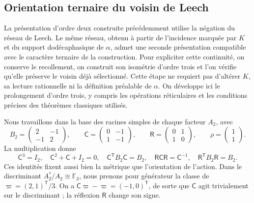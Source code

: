 
\subsection{Orientation ternaire du voisin de Leech}
\label{km:orden-tres-reticular}

La présentation d’ordre deux construite précédemment utilise la négation
du réseau de Leech. Le même réseau, obtenu à partir de l’incidence marquée
par \(K\) et du support dodécaphasique de \(\alpha\), admet une seconde
présentation compatible avec le caractère ternaire de la construction.
Pour expliciter cette continuité, on conserve le recollement, on construit
son isométrie d’ordre trois et l’on vérifie qu’elle préserve le voisin déjà
sélectionné. Cette étape ne requiert pas d’altérer \(K\), sa lecture rationnelle ni
la définition préalable de \(\alpha\). On développe ici le prolongement d’ordre trois, y compris les opérations
réticulaires et les conditions précises des théorèmes classiques utilisés.

Nous travaillons dans la base des racines simples de chaque facteur \(A_2\), avec
\begin{equation}
 B_2=\begin{pmatrix}2&-1\\-1&2\end{pmatrix},\qquad
 \mathsf C=\begin{pmatrix}0&-1\\1&-1\end{pmatrix},\qquad
 \mathsf R=\begin{pmatrix}0&1\\1&0\end{pmatrix},\qquad
 \rho=\begin{pmatrix}1\\1\end{pmatrix}.
 \label{km:coxeter-reflexion}
\end{equation}
La multiplication donne
\[
 \mathsf C^3=I_2,\quad
 \mathsf C^2+\mathsf C+I_2=0,\quad
 \mathsf C^{\mathsf T}B_2\mathsf C=B_2,\quad
 \mathsf R\mathsf C\mathsf R=\mathsf C^{-1},\quad
 \mathsf R^{\mathsf T}B_2\mathsf R=B_2.
\]
Ces identités fixent aussi bien la métrique que l'orientation de l'action. Dans le discriminant \(A_2^*/A_2\cong\mathbb F_3\), nous prenons pour générateur la classe de \(\varpi=(2,1)^{\mathsf T}/3\). On a \(\mathsf C\varpi-\varpi=(-1,0)^{\mathsf T}\), de sorte que \(\mathsf C\) agit trivialement sur le discriminant ; la réflexion \(\mathsf R\) change son signe.

